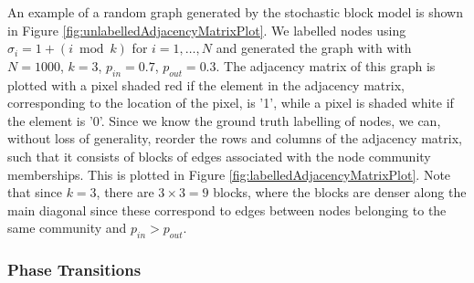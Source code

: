 \documentclass[12pt]{article}
\numberwithin{equation}{section}
\begin{document}
An example of a random graph generated by the stochastic block model is shown in Figure \ref{fig:unlabelledAdjacencyMatrixPlot}. We labelled nodes using $\sigma_{i} = 1 + (i \bmod{k})$ for $i = 1,\dots,N$ and generated the graph with with $N = 1000$, $k = 3$, $p_{in} = 0.7$, $p_{out} = 0.3$. The adjacency matrix of this graph is plotted with a pixel shaded red if the element in the adjacency matrix, corresponding to the location of the pixel, is '1', while a pixel is shaded white if the element is '0'. Since we know the ground truth labelling of nodes, we can, without loss of generality, reorder the rows and columns of the adjacency matrix, such that it consists of blocks of edges associated with the node community memberships. This is plotted in Figure \ref{fig:labelledAdjacencyMatrixPlot}. Note that since $k = 3$, there are $3 \times 3 = 9$ blocks, where the blocks are denser along the main diagonal since these correspond to edges between nodes belonging to the same community and $p_{in} > p_{out}$.


\subsubsection{Phase Transitions}
\label{sec:background;subsec:communityDetection;subsubsec:phaseTransitions}
\end{document}
